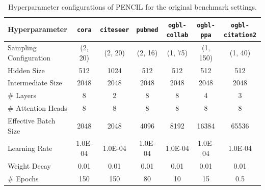 \documentclass{article}
\theoremstyle{plain}
\theoremstyle{definition}
\theoremstyle{remark}
\begin{document}
\begin{table}[tbp]
    \centering
    \caption{Hyperparameter configurations of PENCIL for the original benchmark settings.}
    \label{tab:original_configs}
    \begin{tabular}{@{}lcccccc@{}}
    \toprule
    Hyperparameter         & \texttt{cora}    & \texttt{citeseer} & \texttt{pubmed}  & \texttt{ogbl-collab} & \texttt{ogbl-ppa} & \texttt{ogbl-citation2} \\ \midrule
    Sampling Configuration & (2, 20) & (2, 20)  & (2, 16) & (1, 75)     & (1, 150) & (1, 40)        \\
    Hidden Size            & 512     & 1024     & 512     & 512         & 512      & 512            \\
    Intermediate Size      & 2048    & 2048     & 2048    & 2048        & 2048     & 2048           \\
    \# Layers              & 8       & 2        & 8       & 8           & 4        & 3              \\
    \# Attention Heads     & 8       & 8        & 8       & 8           & 8        & 8              \\
    Effective Batch Size   & 2048    & 2048     & 4096    & 8192        & 16384    & 65536          \\
    Learning Rate          & 1.0E-04 & 1.0E-04  & 1.0E-04 & 1.0E-04     & 1.0E-04  & 1.0E-04        \\
    Weight Decay           & 0.01    & 0.01     & 0.01    & 0.01        & 0.01     & 0.01           \\
    \# Epochs              & 150     & 150      & 80      & 10          & 15       & 0.5            \\ \bottomrule
    \end{tabular}
\end{table}
\end{document}
